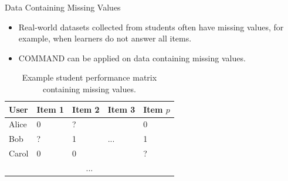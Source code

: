 \documentclass[hyperref={pdfpagelabels=false}]{beamer}
\begin{document}
\begin{frame}{Data Containing Missing Values}
	\begin{itemize}\small
		\item Real-world datasets collected from students often have missing values, for example, when  learners  do not answer  all items.
		\item COMMAND can be applied on data containing missing values. 
	\end{itemize}
\begin{table}[htb]\small
	\centering
	\caption{Example student performance matrix containing missing values.}
	\begin{tabular}{@{}lllll@{}}
		\hline
		User  & Item 1 & Item 2 & Item 3 & Item $p$ \\ \hline
		Alice & 0      & ?      &        & 0        \\
		Bob   & ?      & 1      & ...    & 1        \\
		Carol & 0      & 0      &        & ?        \\
		\multicolumn{5}{c}{...}                     \\ \hline
	\end{tabular}
\end{table}	
\end{frame}
\end{document}
